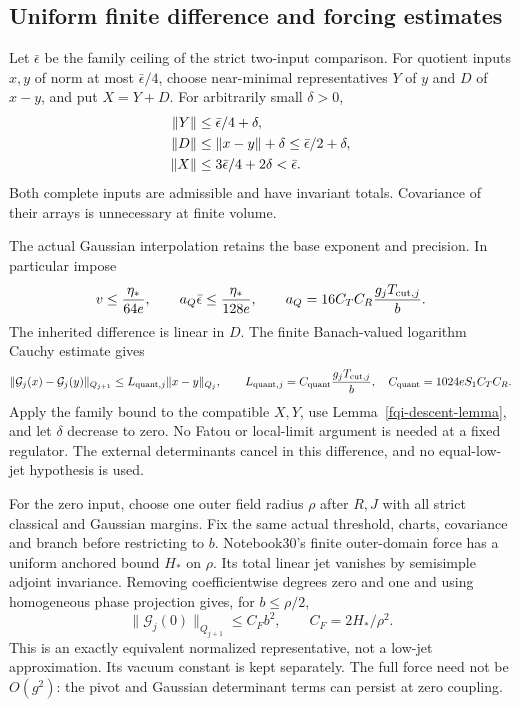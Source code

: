 \documentclass[11pt]{article}
\theoremstyle{remark}
\begin{document}
\subsection{Uniform finite difference and forcing estimates}
\label{fqi-estimates-section}

Let $\bar\epsilon$ be the family ceiling of the strict two-input
comparison. For quotient inputs $x,y$ of norm at most
$\bar\epsilon/4$, choose near-minimal representatives $Y$ of $y$
and $D$ of $x-y$, and put $X=Y+D$. For arbitrarily small
$\delta>0$,
\begin{align}
 \|Y\|&\le\bar\epsilon/4+\delta,\notag\\
 \|D\|&\le\|x-y\|+\delta\le\bar\epsilon/2+\delta,\notag\\
 \|X\|&\le3\bar\epsilon/4+2\delta<\bar\epsilon.
 \label{fqi-compatible-representatives}
\end{align}
Both complete inputs are admissible and have invariant totals.
Covariance of their arrays is unnecessary at finite volume.

The actual Gaussian interpolation retains the base exponent and
precision. In particular impose
\begin{equation}
 v\le\frac{\eta_*}{64e},\qquad
 a_Q\bar\epsilon\le\frac{\eta_*}{128e},\qquad
 a_Q=16C_TC_R\frac{g_jT_{{\rm cut},j}}b.
 \label{fqi-comparison-budgets}
\end{equation}
The inherited difference is linear in $D$. The finite
Banach-valued logarithm Cauchy estimate gives
\begin{equation}
 \|\mathcal G_j(x)-\mathcal G_j(y)\|_{Q_{j+1}}
 \le L_{\mathrm{quant},j}\|x-y\|_{Q_j},\qquad
 L_{\mathrm{quant},j}
   =C_{\mathrm{quant}}\frac{g_jT_{{\rm cut},j}}b,\quad
 C_{\mathrm{quant}}=1024eS_1C_TC_R.
 \label{fqi-quantum-Lipschitz}
\end{equation}
Apply the family bound to the compatible $X,Y$, use
Lemma~\ref{fqi-descent-lemma}, and let $\delta$ decrease to zero.
No Fatou or local-limit argument is needed at a fixed regulator.
The external determinants cancel in this difference, and no
equal-low-jet hypothesis is used.

For the zero input, choose one outer field radius $\rho$ after
$R,J$ with all strict classical and Gaussian margins. Fix the
same actual threshold, charts, covariance and branch before
restricting to $b$. Notebook30's finite outer-domain force has
a uniform anchored bound $H_*$ on $\rho$. Its total linear
jet vanishes by semisimple adjoint invariance. Removing
coefficientwise degrees zero and one and using homogeneous
phase projection gives, for $b\le\rho/2$,
\begin{equation}
 \|\mathcal G_j(0)\|_{Q_{j+1}}\le C_Fb^2,
 \qquad C_F=2H_*/\rho^2.
 \label{fqi-force}
\end{equation}
This is an exactly equivalent normalized representative, not
a low-jet approximation. Its vacuum constant is kept separately.
The full force need not be $O(g^2)$: the pivot and Gaussian
determinant terms can persist at zero coupling.
\end{document}
